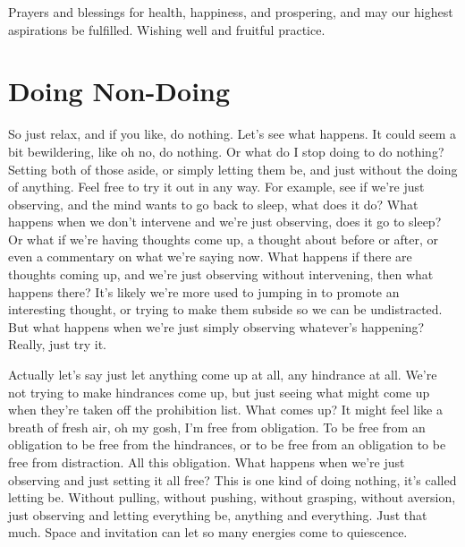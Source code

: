 \documentclass[12pt,openany]{book}
\begin{document}
Prayers and blessings for health, happiness, and prospering, and may our highest aspirations be fulfilled. Wishing well and fruitful practice. 

\bigskip

\begin{figure}[h]
    \centering
\end{figure}

\chapter*{Doing Non-Doing}

So just relax, and if you like, do nothing. Let's see what happens. It could seem a bit bewildering, like oh no, do nothing. Or what do I stop doing to do nothing? Setting both of those aside, or simply letting them be, and just without the doing of anything. Feel free to try it out in any way. For example, see if we’re just observing, and the mind wants to go back to sleep, what does it do? What happens when we don't intervene and we’re just observing, does it go to sleep? Or what if we're having thoughts come up, a thought about before or after, or even a commentary on what we’re saying now. What happens if there are thoughts coming up, and we’re just observing without intervening, then what happens there? It's likely we’re more used to jumping in to promote an interesting thought, or trying to make them subside so we can be undistracted. But what happens when we're just simply observing whatever's happening? Really, just try it.

Actually let's say just let anything come up at all, any hindrance at all. We're not trying to make hindrances come up, but just seeing what might come up when they’re taken off the prohibition list. What comes up? It might feel like a breath of fresh air, oh my gosh, I'm free from obligation. To be free from an obligation to be free from the hindrances, or to be free from an obligation to be free from distraction. All this obligation. What happens when we're just observing and just setting it all free? This is one kind of doing nothing, it’s called letting be. Without pulling, without pushing, without grasping, without aversion, just observing and letting everything be, anything and everything. Just that much. Space and invitation can let so many energies come to quiescence.
\end{document}
